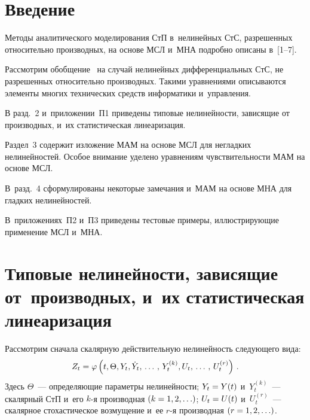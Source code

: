 
\vspace*{12pt}



\thispagestyle{headings}

\begin{multicols}{2}

\label{st\stat}

\section{Введение}

Методы аналитического моделирования  СтП в~нелинейных 
СтС, разрешенных относительно производных, на основе 
МСЛ и~МНА подробно описаны  в~[1--7].

Рассмотрим обобщение~\cite{4-sin, 5-sin} 
на случай нелинейных дифференциальных СтС, не разрешенных относительно производных. 
Такими уравнениями описываются элементы многих технических средств информатики 
и~управления.

В разд.~2 и~приложении~П1 приведены типовые нелинейности, зависящие от производных, и~их 
статистическая линеаризация. 

Раздел~3 содержит изложение МАМ на основе МСЛ для 
негладких нелинейностей. Особое внимание уделено уравнениям чувствительности МАМ 
на основе МСЛ. 

В~разд.~4  сформулированы некоторые замечания и~МАМ на основе МНА 
для гладких нелинейностей. 

В~приложениях~П2  и~П3 приведены тестовые примеры, 
иллюстрирующие применение МСЛ и~МНА.


\section{Типовые нелинейности, зависящие от~производных, и~их статистическая 
линеаризация}

Рассмотрим сначала скалярную действительную нелинейность следующего вида:
    \begin{equation}
    Z_t = \varphi \left(t, \Theta, Y_t, \dot Y_t ,\,\ldots\,,\, Y_t^{(k)}, U_t ,\,\ldots\,,\, U_t^{(r)}\right)\,.
    \label{e2.1-sin}
    \end{equation}
Здесь $\Theta$~--- определяющие параметры нелиней\-ности; $Y_t \hm= Y(t)$ 
и~$Y_t^{(k)}$~--- скалярный СтП и~его $k$-я производная 
$(k\hm=1,2,\ldots)$; $U_t\hm = U(t)$ и~$U_t^{(r)}$~--- 
скалярное стохастическое возмущение и~ее $r$-я
 производная $(r\hm=1,2,\ldots)$.


\end{multicols}
